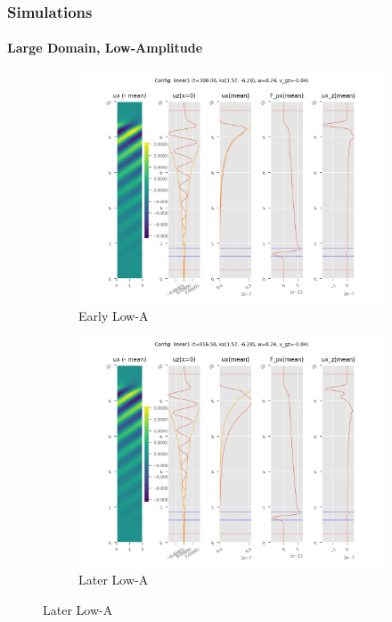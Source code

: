\documentclass[dvipsnames, 10pt]{beamer}
\begin{document}
\begin{frame}
    \frametitle{Simulations}
    \framesubtitle{Large Domain, Low-Amplitude}
    \begin{figure}[t]
        \centering
        \hspace*{-19mm}%
        \begin{subfigure}{0.55\textwidth}
            \centering
            \includegraphics[width=\textwidth]{lin_early.png}
            \caption{Early Low-A}
        \end{subfigure}
        \begin{subfigure}{0.55\textwidth}
            \centering
            \includegraphics[width=\textwidth]{lin_late.png}
            \caption{Later Low-A}
        \end{subfigure}
        \hspace*{-19mm}%
    \end{figure}
\end{frame}
\end{document}
